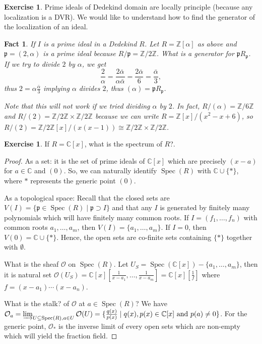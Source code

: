\documentclass{tufte-handout} %
\newtheorem{fact}[thm]{Fact}
\theoremstyle{definition}
\newtheorem{exer}[thm]{Exercise}
\theoremstyle{remark}
\newcommand{\Z}{\mathbb{Z}}
\renewcommand{\C}{\mathbb{C}}
\newcommand{\mO}{\mathcal{O}}
\newcommand{\lp}{{\mathfrak{p}}}
\DeclareMathOperator{\spec}{Spec}
\begin{document}
\begin{exer}
	Prime ideals of Dedekind domain are locally principle (because any localization is a DVR). We would like to understand how to find the generator of the localization of an ideal.
\end{exer}
\begin{fact}
	If $I$ is a prime ideal in a Dedekind $R$. Let $R = \Z[\alpha]$ as above and $\lp = (2,\alpha)$ is a prime ideal because $R/\lp = \Z/2\Z$. What is a generator for $\lp R_{\lp}$. If we try to divide $2$ by $\alpha$, we get 
	\[\frac{2}{\alpha} = \frac{2\bar{\alpha}}{\alpha\bar{\alpha}} = \frac{2\bar{\alpha}}{6} = \frac{\bar{\alpha}}{3},\]
	thus $2 = \alpha \frac{\bar{\alpha}}{3}$ implying $\alpha$ divides $2$, thus $(\alpha) = \lp R_{\lp}$.
	
	Note that this will not work if we tried dividing $\alpha$ by $2$. In fact, $R/(\alpha) = \Z/6\Z$ and $R/(2) = \Z/2\Z \times \Z/2\Z$ because we can write $R = \Z[x]/(x^2-x+6)$, so $R/(2) = \Z/2\Z[x]/(x(x-1)) \cong \Z/2\Z \times \Z/2\Z$.
\end{fact}
\begin{exer}
	If $R = \C[x]$, what is the spectrum of $R$?.
\end{exer}
\begin{proof}
	As a set: it is the set of prime ideals of $\C[x]$ which are precisely $(x-a)$ for $a \in \C$ and $(0)$. So, we can naturally identify $\spec(R)$ with $\C \cup \{\ast\}$, where $\ast$ represents the generic point $(0)$.
	
	As a topological space: Recall that the closed sets are $V(I)= \{\lp \in \spec(R) \mid \lp \supset I\}$ and that any $I$ is generated by finitely many polynomials which will have finitely many common roots. If $I = (f_1, \dots, f_n)$ with common roots $a_1, \dots, a_m$, then $V(I) = \{a_1, \dots, a_m\}$. If $I = 0$, then $V(0) = \C \cup \{\ast\}$. Hence, the open sets are co-finite sets containing $\{\ast\}$ together with $\emptyset$.
	
	What is the sheaf $\mO$ on $\spec(R)$. Let $U_S = \spec(\C[x]) - \{a_1, \dots, a_m\}$, then it is natural set $\mO(U_S) = \C[x][\frac{1}{x-a_1}, \dots, \frac{1}{x-a_m}]= \C[x][\frac{1}{f}]$ where $f = (x-a_1)\cdots(x-a_n)$.
	
	What is the stalk? of $\mO$ at $a \in \spec(R)$? We have $\mO_a = \varinjlim_{U \subseteq \spec(R), a \in U} \mO(U) = \{\frac{q(x)}{p(x)} \mid q(x),p(x) \in \C[x] \text{ and } p(a) \neq 0\}$. For the generic point, $\mO_{\ast}$ is the inverse limit of every open sets which are non-empty which will yield the fraction field.
\end{proof}
\end{document}
